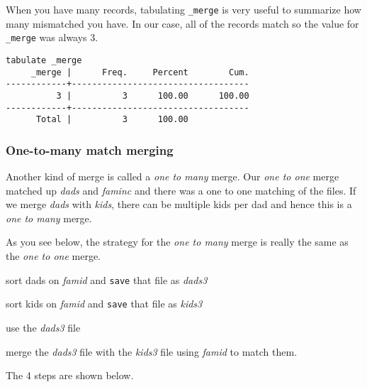 When you have many records, tabulating \lstinline{_merge} is very useful to summarize how many mismatched you have. In our case, all of the records match so the value for \lstinline{_merge} was always 3.

\begin{lstlisting}
tabulate _merge
     _merge |      Freq.     Percent        Cum.
------------+-----------------------------------
          3 |          3      100.00      100.00
------------+-----------------------------------
      Total |          3      100.00
\end{lstlisting}

\subsubsection{One-to-many match merging}

Another kind of merge is called a \textit{one to many} merge. Our \textit{one to one} merge matched up \textit{dads} and \textit{faminc} and there was a one to one matching of the files. If we merge \textit{dads} with \textit{kids}, there can be multiple kids per dad and hence this is a \textit{one to many} merge.

As you see below, the strategy for the \textit{one to many} merge is really the same as the \textit{one to one} merge.

\begin{compactenum}
\item sort dads on \textit{famid} and \lstinline{save} that file as \textit{dads3}
\item sort kids on \textit{famid} and \lstinline{save} that file as \textit{kids3}
\item use the \textit{dads3} file
\item merge the \textit{dads3} file with the \textit{kids3} file using \textit{famid} to match them.
\end{compactenum}

The 4 steps are shown below.

